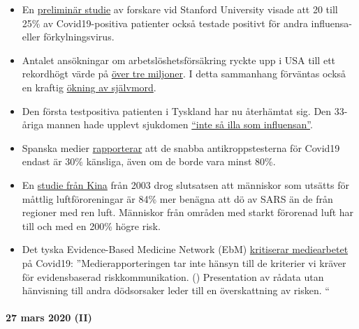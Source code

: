 \begin{itemize}
\tightlist
\item
  En
  \href{https://medium.com/@nigam/higher-co-infection-rates-in-covid19-b24965088333}{preliminär
  studie} av forskare vid Stanford University visade att 20 till 25\% av
  Covid19-positiva patienter också testade positivt för andra influensa-
  eller förkylningsvirus.
\item
  Antalet ansökningar om arbetslöshetsförsäkring ryckte upp i USA till
  ett rekordhögt värde på
  \href{https://www.businessinsider.com/us-weekly-jobless-claims-record-coronavirus-unemployment-insurance-labor-recession-2020-3}{över
  tre miljoner}. I detta sammanhang förväntas också en kraftig
  \href{https://twitter.com/KoenSwinkels/status/1243066532390977544}{ökning
  av självmord}.
\item
  Den första testpositiva patienten i Tyskland har nu återhämtat sig.
  Den 33-åriga mannen hade upplevt sjukdomen
  \href{https://www.br.de/nachrichten/bayern/coronavirus-patient-nummer-1-wie-ich-die-quarantaene-erlebte,Rrm4Ul8}{``inte
  så illa som influensan''}.
\item
  Spanska medier
  \href{https://elpais.com/sociedad/2020-03-25/los-test-rapidos-de-coronavirus-comprados-en-china-no-funcionan.html}{rapporterar}
  att de snabba antikroppstesterna för Covid19 endast är 30\% känsliga,
  även om de borde vara minst 80\%.
\item
  En
  \href{https://ehjournal.biomedcentral.com/articles/10.1186/1476-069X-2-15}{studie
  från Kina} från 2003 drog slutsatsen att människor som utsätts för
  måttlig luftföroreningar är 84\% mer benägna att dö av SARS än de från
  regioner med ren luft. Människor från områden med starkt förorenad
  luft har till och med en 200\% högre risk.
\item
  Det tyska Evidence-Based Medicine Network (EbM)
  \href{https://www.ebm-netzwerk.de/de/veroeffentlichungen/covid-19}{kritiserar
  mediearbetet} på Covid19: ''Medierapporteringen tar inte hänsyn till
  de kriterier vi kräver för evidensbaserad riskkommunikation. ()
  Presentation av rådata utan hänvisning till andra dödsorsaker leder
  till en överskattning av risken. ``
\end{itemize}

\hypertarget{27-mars-2020-ii}{%
\paragraph{27 mars 2020 (II)}\label{27-mars-2020-ii}}

